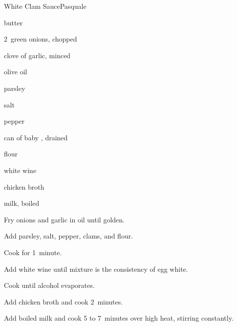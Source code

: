 \begin{recipe}{White Clam Sauce}{Pasquale}{}

\begin{ingredients}
\item {} butter
\item 2~green onions, chopped
\item clove of garlic, minced
\item olive oil
\item parsley
\item salt
\item pepper
\item can of baby , drained
\item {} flour
\item white wine
\item {} chicken broth
\item {} milk, boiled
\end{ingredients}

\begin{directions}
\item Fry onions and garlic in oil until golden.
\item Add parsley, salt, pepper, clams, and flour.
\item Cook for 1~minute.
\item Add white wine until mixture is the consistency of egg white.
\item Cook until alcohol evaporates.
\item Add chicken broth and cook 2~minutes.
\item Add boiled milk and cook 5 to 7~minutes over high heat, stirring constantly.
\end{directions}

\end{recipe}
